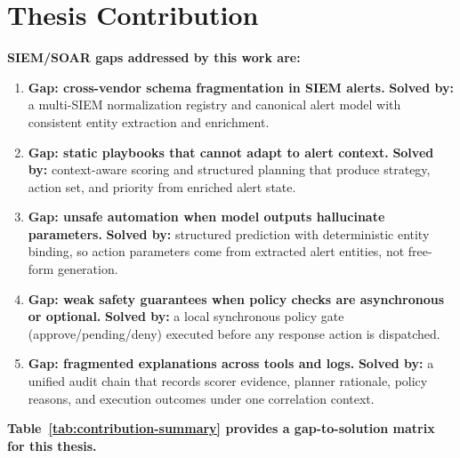 \section{Thesis Contribution}
\label{sec:thesis-contribution}

\begin{center}
\end{center}

\noindent\textbf{SIEM/SOAR gaps addressed by this work are:}
\begin{enumerate}
  \item \textbf{Gap: cross-vendor schema fragmentation in SIEM alerts.}
  \textbf{Solved by:} a multi-SIEM normalization registry and canonical alert model with
  consistent entity extraction and enrichment.
  \item \textbf{Gap: static playbooks that cannot adapt to alert context.}
  \textbf{Solved by:} context-aware scoring and structured planning that produce strategy,
  action set, and priority from enriched alert state.
  \item \textbf{Gap: unsafe automation when model outputs hallucinate parameters.}
  \textbf{Solved by:} structured prediction with deterministic entity binding, so action
  parameters come from extracted alert entities, not free-form generation.
  \item \textbf{Gap: weak safety guarantees when policy checks are asynchronous or optional.}
  \textbf{Solved by:} a local synchronous policy gate (approve/pending/deny) executed before
  any response action is dispatched.
  \item \textbf{Gap: fragmented explanations across tools and logs.}
  \textbf{Solved by:} a unified audit chain that records scorer evidence, planner rationale,
  policy reasons, and execution outcomes under one correlation context.
\end{enumerate}

\noindent\textbf{Table~\ref{tab:contribution-summary} provides a gap-to-solution matrix for this thesis.}

